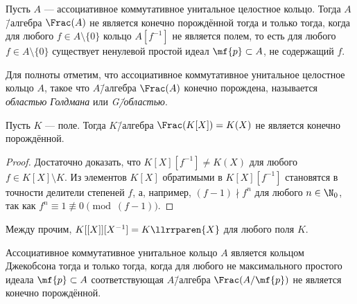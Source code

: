\documentclass[
	extrafontsizes,
	11pt,
	hyphens,
]{memoir}
\begin{document}
\begin{observation}
Пусть \(A\) --- ассоциативное коммутативное унитальное целостное кольцо.%
\label{obs:JacDomFrac}
Тогда \(A\)\=/алгебра \(\Frac(A)\) не является конечно порождённой тогда и только тогда, когда для любого \(f \in A \setminus \{0\}\) кольцо \(A[f^{-1}]\) не является полем, то есть для любого \(f \in A \setminus \{0\}\) существует ненулевой простой идеал \(\mf{p} \subset A\), не содержащий \(f\).
\end{observation}

\begin{remark}
Для полноты отметим, что ассоциативное коммутативное унитальное целостное кольцо \(A\), такое что \(A\)\=/алгебра \(\Frac(A)\) конечно порождена, называется \emph{областью Голдмана} или \emph{G\=/областью}.
\end{remark}

\begin{theorem}
Пусть \(K\) --- поле.%
\label{thm:FieldPolyFracInfGen}
Тогда \(K\)\=/алгебра \(\Frac(K[X]) = K(X)\) не является конечно порождённой.
\end{theorem}

\begin{proof}
Достаточно доказать, что \(K[X][f^{-1}] \neq K(X)\) для любого \(f \in K[X] \setminus K\).
Из элементов \(K[X]\) обратимыми в \(K[X][f^{-1}]\) становятся в точности делители степеней \(f\),
а, например, \((f-1) \nmid f^n\) для любого \(n \in \N_0\), так как \(f^n \equiv 1 \not\equiv 0 \pmod{(f-1)}\).
\end{proof}


\begin{example}
Между прочим, \(K[[X]][X^{-1}] = K\llrrparen{X}\) для любого поля \(K\).
\end{example}

\begin{theorem}
Ассоциативное коммутативное унитальное кольцо \(A\) является кольцом Джекобсона тогда и только тогда, когда\label{thm:JacRingCharFrac} для любого не максимального простого идеала \(\mf{p} \subset A\) соответствующая \(A\)\=/алгебра \(\Frac(A / \mf{p})\) не является конечно порождённой.
\end{theorem}
\end{document}
